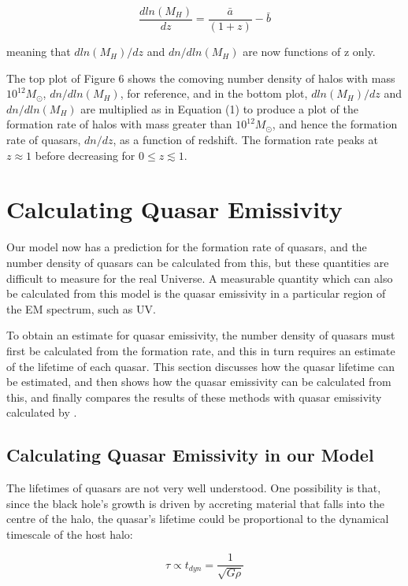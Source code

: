 \documentclass[12pt]{article}%
\begin{document}
\begin{equation}
    \frac{dln(M_H)}{dz}=\frac{\bar a}{(1+z)}-\bar b
\end{equation}

\noindent meaning that $dln(M_H)/dz$ and $dn/dln(M_H)$ are now functions of z only.\par

The top plot of Figure 6 shows the comoving number density of halos with mass $10^{12}M_\odot$, $dn/dln(M_H)$, for reference, and in the bottom plot, $dln(M_H)/dz$ and $dn/dln(M_H)$ are multiplied as in Equation (1) to produce a plot of the formation rate of halos with mass greater than $10^{12}M_\odot$, and hence the formation rate of quasars, $dn/dz$, as a function of redshift. The formation rate peaks at $z\approx1$ before decreasing for $0\leq z\lesssim1$.

\section{Calculating Quasar Emissivity}

Our model now has a prediction for the formation rate of quasars, and the number density of quasars can be calculated from this, but these quantities are difficult to measure for the real Universe. A measurable quantity which can also be calculated from this model is the quasar emissivity in a particular region of the EM spectrum, such as UV.\par

To obtain an estimate for quasar emissivity, the number density of quasars must first be calculated from the formation rate, and this in turn requires an estimate of the lifetime of each quasar. This section discusses how the quasar lifetime can be estimated, and then shows how the quasar emissivity can be calculated from this, and finally compares the results of these methods with quasar emissivity calculated by \cite{Haardt_Madau}.

\subsection{Calculating Quasar Emissivity in our Model}

The lifetimes of quasars are not very well understood. One possibility is that, since the black hole’s growth is driven by accreting material that falls into the centre of the halo, the quasar’s lifetime could be proportional to the dynamical timescale of the host halo:

\begin{equation}
    \tau\propto t_{dyn}=\frac{1}{\sqrt{G\rho}}
\end{equation}
\end{document}

